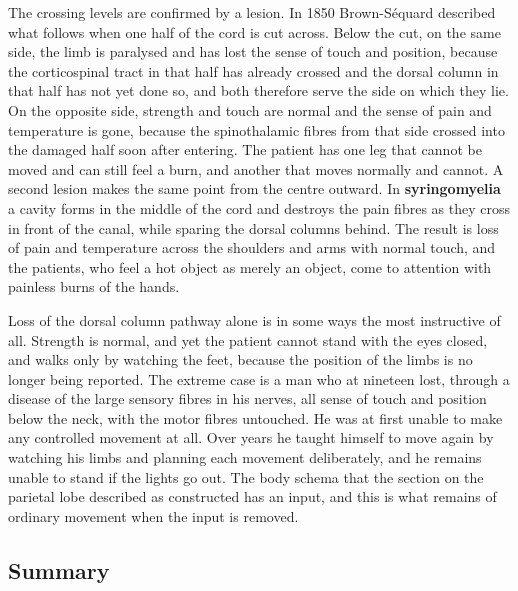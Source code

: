 \documentclass[11pt]{article}
\begin{document}
The crossing levels are confirmed by a lesion. In 1850 Brown-S\'equard described what follows when one half of the cord is cut across. Below the cut, on the same side, the limb is paralysed and has lost the sense of touch and position, because the corticospinal tract in that half has already crossed and the dorsal column in that half has not yet done so, and both therefore serve the side on which they lie. On the opposite side, strength and touch are normal and the sense of pain and temperature is gone, because the spinothalamic fibres from that side crossed into the damaged half soon after entering. The patient has one leg that cannot be moved and can still feel a burn, and another that moves normally and cannot. A second lesion makes the same point from the centre outward. In \textbf{syringomyelia} a cavity forms in the middle of the cord and destroys the pain fibres as they cross in front of the canal, while sparing the dorsal columns behind. The result is loss of pain and temperature across the shoulders and arms with normal touch, and the patients, who feel a hot object as merely an object, come to attention with painless burns of the hands.

Loss of the dorsal column pathway alone is in some ways the most instructive of all. Strength is normal, and yet the patient cannot stand with the eyes closed, and walks only by watching the feet, because the position of the limbs is no longer being reported. The extreme case is a man who at nineteen lost, through a disease of the large sensory fibres in his nerves, all sense of touch and position below the neck, with the motor fibres untouched. He was at first unable to make any controlled movement at all. Over years he taught himself to move again by watching his limbs and planning each movement deliberately, and he remains unable to stand if the lights go out. The body schema that the section on the parietal lobe described as constructed has an input, and this is what remains of ordinary movement when the input is removed.

\subsection{Summary}
\end{document}
